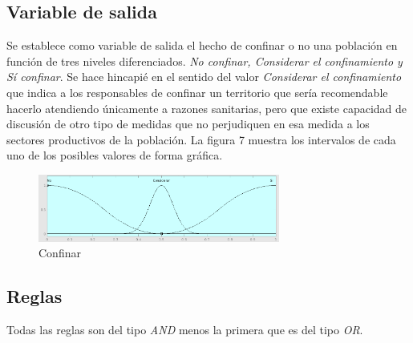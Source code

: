 \documentclass[12pt,a4paper, xcolor=table]{article}
\begin{document}
\subsection{Variable de salida}
    
Se establece como variable de salida el hecho de confinar o no una población en función de tres niveles diferenciados. \textit{No confinar, Considerar el confinamiento y Sí confinar}. Se hace hincapié en el sentido del valor \textit{Considerar el confinamiento} que indica a los responsables de confinar un territorio que sería recomendable hacerlo atendiendo únicamente a razones sanitarias, pero que existe capacidad de discusión de otro tipo de medidas que no perjudiquen en esa medida a los sectores productivos de la población.  La figura 7 muestra los intervalos de cada uno de los posibles valores de forma gráfica.

\begin{figure}[!h]
  \centering
  \includegraphics[width=300px]{img/confinar.png}
  \caption{Confinar}
\end{figure}

\subsection{Reglas}

Todas las reglas son del tipo \textit{AND} menos la primera que es del tipo \textit{OR}.
\end{document}
